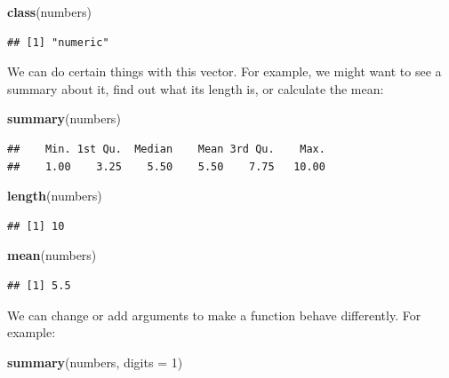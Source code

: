\documentclass[
]{book}
\newenvironment{Shaded}{\begin{snugshade}}{\end{snugshade}}
\newcommand{\DataTypeTok}[1]{\textcolor[rgb]{0.13,0.29,0.53}{#1}}
\newcommand{\DecValTok}[1]{\textcolor[rgb]{0.00,0.00,0.81}{#1}}
\newcommand{\KeywordTok}[1]{\textcolor[rgb]{0.13,0.29,0.53}{\textbf{#1}}}
\newcommand{\NormalTok}[1]{#1}
\begin{document}
\begin{Shaded}
\begin{Highlighting}[]
\KeywordTok{class}\NormalTok{(numbers)}
\end{Highlighting}
\end{Shaded}

\begin{verbatim}
## [1] "numeric"
\end{verbatim}

We can do certain things with this vector. For example, we might want to see a
summary about it, find out what its length is, or calculate the mean:

\begin{Shaded}
\begin{Highlighting}[]
\KeywordTok{summary}\NormalTok{(numbers)}
\end{Highlighting}
\end{Shaded}

\begin{verbatim}
##    Min. 1st Qu.  Median    Mean 3rd Qu.    Max. 
##    1.00    3.25    5.50    5.50    7.75   10.00
\end{verbatim}

\begin{Shaded}
\begin{Highlighting}[]
\KeywordTok{length}\NormalTok{(numbers)}
\end{Highlighting}
\end{Shaded}

\begin{verbatim}
## [1] 10
\end{verbatim}

\begin{Shaded}
\begin{Highlighting}[]
\KeywordTok{mean}\NormalTok{(numbers)}
\end{Highlighting}
\end{Shaded}

\begin{verbatim}
## [1] 5.5
\end{verbatim}

We can change or add arguments to make a function behave differently. For example:

\begin{Shaded}
\begin{Highlighting}[]
\KeywordTok{summary}\NormalTok{(numbers, }\DataTypeTok{digits =} \DecValTok{1}\NormalTok{)}
\end{Highlighting}
\end{Shaded}
\end{document}
